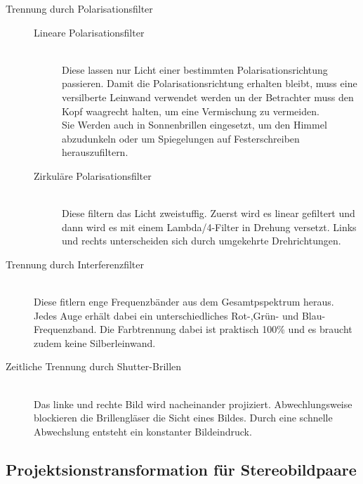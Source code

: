 \documentclass[10pt]{article}
\begin{document}
\begin{description}
\begin{description}
		\end{description}
	\item[Trennung durch Polarisationsfilter] \hfill
		\begin{description}
			\item[Lineare Polarisationsfilter] \hfill \\
				Diese lassen nur Licht einer bestimmten Polarisationsrichtung passieren. Damit die Polarisationsrichtung erhalten bleibt, muss eine versilberte Leinwand verwendet werden un der Betrachter muss den Kopf waagrecht halten, um eine Vermischung zu vermeiden. \\
				Sie Werden auch in Sonnenbrillen eingesetzt, um den Himmel abzudunkeln oder um Spiegelungen auf Festerschreiben herauszufiltern.
			\item[Zirkuläre Polarisationsfilter] \hfill \\
				Diese filtern das Licht zweistuffig. Zuerst wird es linear gefiltert und dann wird es mit einem Lambda/4-Filter in Drehung versetzt. Links und rechts unterscheiden sich durch umgekehrte Drehrichtungen.
		\end{description}
	\item[Trennung durch Interferenzfilter] \hfill \\
		Diese fitlern enge Frequenzbänder aus dem Gesamtpspektrum heraus. Jedes Auge erhält dabei ein unterschiedliches Rot-,Grün- und Blau-Frequenzband. Die Farbtrennung dabei ist praktisch 100\% und es braucht zudem keine Silberleinwand.
	\item[Zeitliche Trennung durch Shutter-Brillen] \hfill \\
		Das linke und rechte Bild wird nacheinander projiziert. Abwechlungsweise blockieren die Brillengläser die Sicht eines Bildes. Durch eine schnelle Abwechslung entsteht  ein konstanter Bildeindruck. 
\end{description}
\subsection{Projektsionstransformation für Stereobildpaare}
\end{document}
